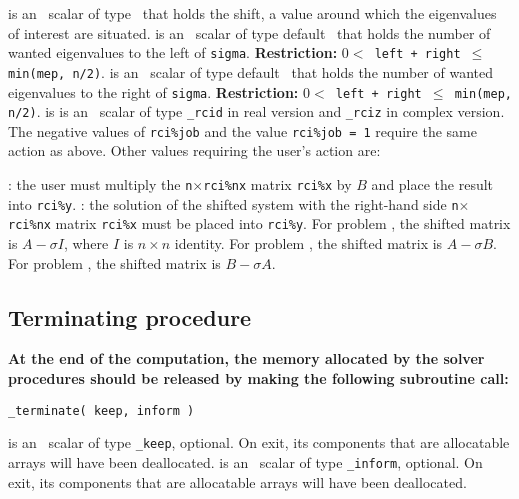 \begin{description}
%
 is an \intentin\ scalar of type \REALDP\
that holds the shift, 
a value around which the eigenvalues of interest are situated.
%
 is an \intentin\ scalar of type default \Integer\ 
that holds the number of wanted eigenvalues to the left of {\tt sigma}.
{\bf Restriction:} {\tt $0 < $ left + right $\le$ min(mep, n/2)}.
%
\itt{right} is an \intentin\ scalar of type default \Integer\ 
that holds the number of wanted eigenvalues to the right of {\tt sigma}.
{\bf Restriction:} {\tt $0 < $ left + right $\le$ min(mep, n/2)}.
%
\itt{rci} is is an \intentinout\  scalar  of type
{\tt \solver\_rcid} in real version and
{\tt \solver\_rciz} in complex version.
The negative values of {\tt rci\%job}
and the value {\tt rci\%job = 1}
require the same action as above.
Other values requiring the user's action are:
%
\begin{description}
%
:
the user must multiply the {\tt n}$\times${\tt rci\%nx} matrix
{\tt rci\%x} by $B$ and place the result into {\tt rci\%y}.
%
\itt{~9}:
the solution of the shifted system
with the right-hand side {\tt n}$\times${\tt rci\%nx} matrix {\tt rci\%x}
must be placed into {\tt rci\%y}.
For problem \Ref{evp}, the shifted matrix is $A - \sigma I$,
where $I$ is $n\times n$ identity.
For problem \Ref{evp.g}, the shifted matrix is $A - \sigma B$.
For problem \Ref{evp.b}, the shifted matrix is $B - \sigma A$.
%
\end{description}
%
\end{description}

\subsection{Terminating procedure}

{\bf
At the end of the computation, the memory 
allocated by the solver procedures
should be released
by making the following subroutine call:
}

\medskip

\hspace{8mm} {\tt \solver\_terminate( keep, inform )}

\begin{description}
%
 is an \intentinout\ scalar of type 
{\tt \solver\_keep}, optional. 
On exit, its components that are allocatable arrays will have been deallocated. 
%
\itt{inform} is an \intentinout\ scalar of type {\tt \solver\_inform}, 
optional.
On exit, its components that are allocatable arrays will have been deallocated. 
%
\end{description}

